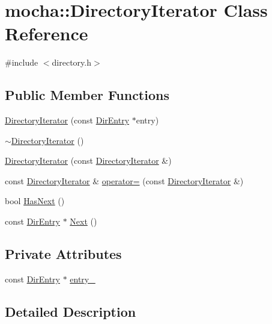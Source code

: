 \hypertarget{classmocha_1_1_directory_iterator}{
\section{mocha::DirectoryIterator Class Reference}
\label{classmocha_1_1_directory_iterator}
}


{\ttfamily \#include $<$directory.h$>$}

\subsection*{Public Member Functions}
\begin{DoxyCompactItemize}
\item 
\hyperlink{classmocha_1_1_directory_iterator_af233265c5a3e9e4d2957105b8976d91d}{DirectoryIterator} (const \hyperlink{classmocha_1_1_dir_entry}{DirEntry} $\ast$entry)
\item 
\hyperlink{classmocha_1_1_directory_iterator_aea16020dec3da1cf619122ce7c238592}{$\sim$DirectoryIterator} ()
\item 
\hyperlink{classmocha_1_1_directory_iterator_a13f2e264719b1c30a7614c138b95462e}{DirectoryIterator} (const \hyperlink{classmocha_1_1_directory_iterator}{DirectoryIterator} \&)
\item 
const \hyperlink{classmocha_1_1_directory_iterator}{DirectoryIterator} \& \hyperlink{classmocha_1_1_directory_iterator_ad30f8144d759353ede81b95bffa486ec}{operator=} (const \hyperlink{classmocha_1_1_directory_iterator}{DirectoryIterator} \&)
\item 
bool \hyperlink{classmocha_1_1_directory_iterator_a5c25f98e3982ce06f4b042130fc40c00}{HasNext} ()
\item 
const \hyperlink{classmocha_1_1_dir_entry}{DirEntry} $\ast$ \hyperlink{classmocha_1_1_directory_iterator_a5a7df05187d775a7f0b7746ce77c4457}{Next} ()
\end{DoxyCompactItemize}
\subsection*{Private Attributes}
\begin{DoxyCompactItemize}
\item 
const \hyperlink{classmocha_1_1_dir_entry}{DirEntry} $\ast$ \hyperlink{classmocha_1_1_directory_iterator_a91d06f432f427c12545b628a11286688}{entry\_\-}
\end{DoxyCompactItemize}


\subsection{Detailed Description}


